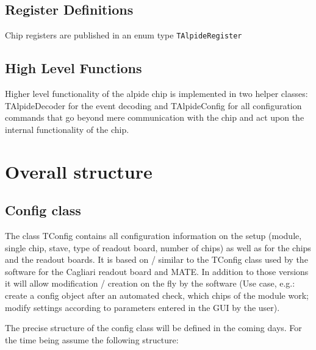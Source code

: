 \documentclass{article}
\let\oldsection\section
\renewcommand\section{\clearpage\oldsection}
\begin{document}
\subsection {Register Definitions} 

Chip registers are published in an enum type \texttt{TAlpideRegister}

\subsection{High Level Functions}

Higher level functionality of the alpide chip is implemented in two
helper classes: TAlpideDecoder for the event decoding and
TAlpideConfig for all configuration commands that go beyond mere
communication with the chip and act upon the internal functionality of
the chip.

\section {Overall structure}


\subsection{Config class}

The class TConfig contains all configuration information on the setup
(module, single chip, stave, type of readout board, number of chips)
as well as for the chips and the readout boards. It is based on /
similar to the TConfig class used by the software for the Cagliari
readout board and MATE. In addition to those versions it will allow
modification / creation on the fly by the software (Use case, e.g.:
create a config object after an automated check, which chips of the
module work; modify settings according to parameters entered in the
GUI by the user). 

The precise structure of the config class will be defined in the
coming days. For the time being assume the following structure: 
\end{document}
